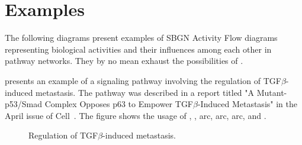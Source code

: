 
\chapter{Examples}


The following diagrams present examples of SBGN Activity Flow diagrams representing biological activities and their influences among each other in pathway networks.  They by no mean exhaust the possibilities of \SBGNAFLone.

 presents an example of a signaling pathway involving the regulation of TGF$\beta$-induced metastasis.  The pathway was described in a report titled "A Mutant-p53/Smad Complex Opposes p63 to Empower TGF$\beta$-Induced Metastasis" in the April issue of Cell~\cite{Adorno:2009}.  The figure shows the usage of , ,  arc,  arc,  arc, and .

\begin{figure}
\begin{center}
\caption{Regulation of TGF$\beta$-induced metastasis.}\label{fig:TGF}
\end{center}
\end{figure}

